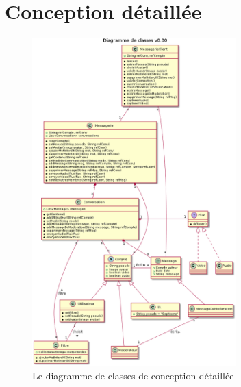 \documentclass[11pt,dvipsnames,svgnames]{report}
\begin{document}
\chapter{Conception détaillée}
\begin{figure}[H]
\centerline{\includegraphics[width=0.7\textwidth]{diagrammes/detailedConception.png}}
\caption{Le diagramme de classes de conception détaillée}
\end{figure}
\end{document}
